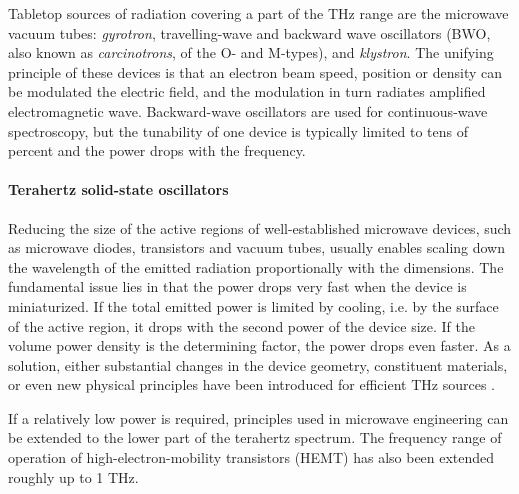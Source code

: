 Tabletop sources of radiation covering a part of the THz range are the microwave vacuum tubes: \textit{gyrotron}, travelling-wave and backward wave oscillators (BWO, also known as \textit{carcinotrons}, of the O- and M-types), and \textit{klystron}. The unifying principle of these devices is that an electron beam speed, position or density can be modulated the electric field, and the modulation in turn radiates amplified electromagnetic wave. Backward-wave oscillators are %
 used for continuous-wave spectroscopy, but the tunability of one device is typically limited to tens of percent and the power drops with the frequency.

\paragraph{Terahertz solid-state oscillators}%
Reducing the size of the active regions of well-established microwave devices, such as microwave diodes, transistors and vacuum tubes, usually enables scaling down the wavelength of the emitted radiation proportionally with the dimensions. 
The fundamental issue lies in that the power drops very fast when the device is miniaturized. If the total emitted power is limited by cooling, i.e. by the surface of the active region, it drops with the second power of the device size. If the volume power density is the determining factor, the power drops even faster.  %
As a solution, either substantial changes in the device geometry, constituent materials, or even new physical principles have been introduced for efficient THz sources \cite[pp. 8-12]{sullivan2012field}.  


If a relatively low power is required, principles used in microwave engineering can be extended to the lower part of the terahertz spectrum.  %
The frequency range of operation of high-electron-mobility transistors (HEMT) has also been extended roughly up to 1 THz. %

